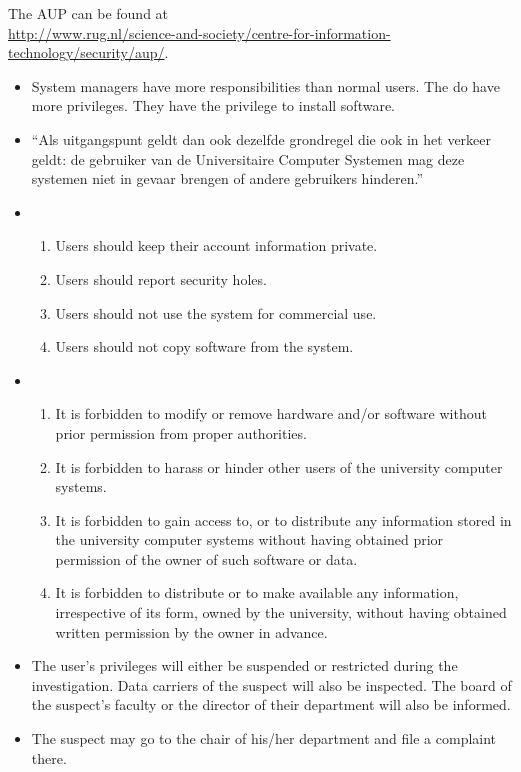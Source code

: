 The AUP can be found at \hfill \\ \url{http://www.rug.nl/science-and-society/centre-for-information-technology/security/aup/}.
\begin{itemize}
	\item System managers have more responsibilities than normal users. The do have more privileges. They have the privilege to install software.
	\item ``Als uitgangspunt geldt dan ook dezelfde grondregel die ook in het verkeer geldt: de gebruiker van de Universitaire Computer Systemen mag deze systemen niet in gevaar brengen of andere gebruikers hinderen.''
	\item \begin{enumerate}
		\item Users should keep their account information private.
		\item Users should report security holes.
		\item Users should not use the system for commercial use.
		\item Users should not copy software from the system.
		\end{enumerate}
	\item \begin{enumerate}
		\item It is forbidden to modify or remove hardware and/or software without prior permission from proper authorities.
		\item It is forbidden to harass or hinder other users of the university computer systems.
		\item It is forbidden to gain access to, or to distribute any information stored in the university computer systems without having obtained prior permission of the owner of such software or data.
		\item It is forbidden to distribute or to make available any information, irrespective of its form, owned by the university, without having obtained written permission by the owner in advance.
		\end{enumerate}
	\item The user's privileges will either be suspended or restricted during the investigation. Data carriers of the suspect will also be inspected. The board of the suspect's faculty or the director of their department will also be informed.
	\item The suspect may go to the chair of his/her department and file a complaint there.
\end{itemize}